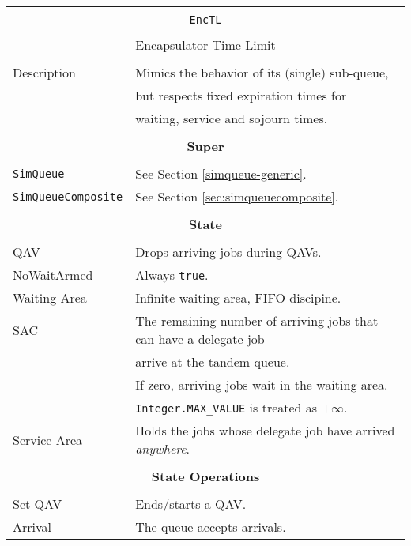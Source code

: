 \begin{tabular}{|l|l|}
	\hline
	\multicolumn{2}{|c|}{} \\
	\multicolumn{2}{|c|}{\lstinline[basicstyle=\large]{EncTL}} \\
	\multicolumn{2}{|c|}{} \\
	\multicolumn{2}{|c|}{Encapsulator-Time-Limit} \\
	\multicolumn{2}{|c|}{} \\
	\hline
	Description & Mimics the behavior of its (single) sub-queue, \\
	& but respects fixed expiration times for \\
	& waiting, service and sojourn times. \\
	\hline
	\multicolumn{2}{|c|}{} \\
	\multicolumn{2}{|c|}{\bf Super} \\
	\multicolumn{2}{|c|}{} \\
	\hline
	\lstinline|SimQueue| & See Section \ref{simqueue-generic}. \\
	\lstinline|SimQueueComposite| & See Section \ref{sec:simqueuecomposite}. \\
	\hline
	\multicolumn{2}{|c|}{} \\
	\multicolumn{2}{|c|}{\bf State} \\
	\multicolumn{2}{|c|}{} \\
	\hline
	QAV & Drops arriving jobs during QAVs. \\
	\hline
	NoWaitArmed & Always \lstinline|true|. \\
	\hline
	Waiting Area & Infinite waiting area, FIFO discipine. \\
	\hline
	SAC & The remaining number of arriving jobs that can have a delegate job \\
	& arrive at the tandem queue. \\
	& If zero, arriving jobs wait in the waiting area. \\
	& \lstinline|Integer.MAX_VALUE| is treated as $+\infty$. \\
	\hline
	Service Area & Holds the jobs whose delegate job have arrived {\em anywhere}. \\
	\hline
	\multicolumn{2}{|c|}{} \\
	\multicolumn{2}{|c|}{\bf State Operations} \\
	\multicolumn{2}{|c|}{} \\
	\hline
	Set QAV & Ends/starts a QAV. \\
	\hline
	Arrival & The queue accepts arrivals. \\

\end{tabular}
